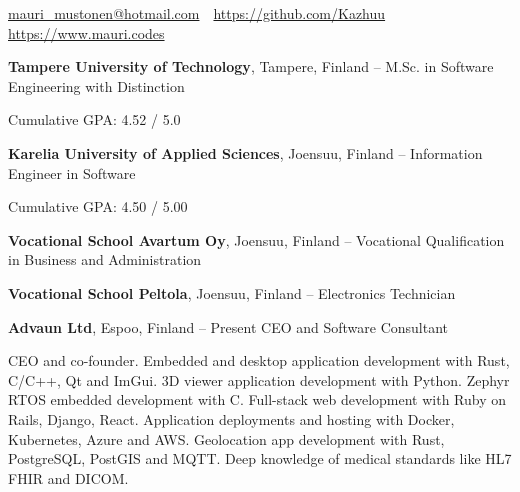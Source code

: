 \documentclass[letterpaper,MMMyyyy,nonstopmode]{simpleresumecv}
\newcommand{\CVAuthor}{Mauri Mustonen}
\newcommand{\CVWebpage}{https://www.mauri.codes}
\begin{document}

\Title{\CVAuthor}

\begin{SubTitle}
    \par
    \href{mailto:mauri\_mustonen@hotmail.com}{mauri\_mustonen@hotmail.com}\,
    \SubBulletSymbol\,
    \href{https://github.com/Kazhuu}{https://github.com/Kazhuu}\,
    \SubBulletSymbol\,
    \href{\CVWebpage}{\url{\CVWebpage}}
\end{SubTitle}

\begin{Body}



\Entry
\textbf{Tampere University of Technology}, Tampere, Finland
\hfill
{} -- 
\Gap
\BulletItem
M.Sc. in Software Engineering with Distinction
\begin{Detail}
    \SubBulletItem Cumulative GPA: 4.52 / 5.0
\end{Detail}

\BigGap
\Entry
\textbf{Karelia University of Applied Sciences}, Joensuu, Finland
\hfill
{} -- 
\Gap
\BulletItem
Information Engineer in Software
\begin{Detail}
    \SubBulletItem Cumulative GPA: 4.50 / 5.00
\end{Detail}

\BigGap
\Entry
\textbf{Vocational School Avartum Oy}, Joensuu, Finland
\hfill
{} -- 
\Gap
\BulletItem
Vocational Qualification in Business and Administration

\BigGap
\Entry
\textbf{Vocational School Peltola}, Joensuu, Finland
\hfill
{} -- 
\Gap
\BulletItem
Electronics Technician



\Entry
\BigGap
\Entry
\textbf{Advaun Ltd}, Espoo, Finland
\hfill
{} -- Present
\Gap
\BulletItem CEO and Software Consultant
\begin{Detail}
    \SubBulletItem CEO and co-founder.
    \SubBulletItem Embedded and desktop application development with Rust, C/C++, Qt and ImGui.
    \SubBulletItem 3D viewer application development with Python.
    \SubBulletItem Zephyr RTOS embedded development with C.
    \SubBulletItem Full-stack web development with Ruby on Rails, Django, React.
    \SubBulletItem Application deployments and hosting with Docker, Kubernetes, Azure and AWS.
    \SubBulletItem Geolocation app development with Rust, PostgreSQL, PostGIS and MQTT.
    \SubBulletItem Deep knowledge of medical standards like HL7 FHIR and DICOM.
\end{Detail}


\end{Body}
\end{document}
